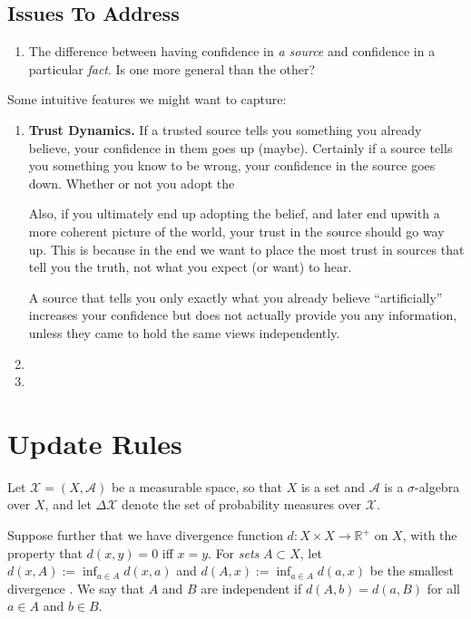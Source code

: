 \documentclass{article}
\begin{document}
\subsection*{Issues To Address}
\begin{enumerate}
    \item The difference between having confidence in \emph{a source} and confidence in a particular \emph{fact}.  Is one more general than the other? 
\end{enumerate}
    
Some intuitive features we might want to capture:
\begin{enumerate}
    
    \item \textbf{Trust Dynamics.} If a trusted source tells you something you already believe, your confidence in them goes up (maybe). Certainly if a source tells you something you know to be wrong, your confidence in the source goes down.  Whether or not you adopt the 
    
    Also, if you ultimately end up adopting the belief, and later end upwith a more coherent picture of the world, your trust in the source should go way up. 
    This is because in the end we want to place the most trust in sources that tell you the truth, not what you expect (or want) to hear.
    
    A source that tells you only exactly what you already believe ``artificially'' increases your confidence but does not actually provide you any information, unless they came to hold the same views independently. 
    
    \item 
    \item 
\end{enumerate}

\section{Update Rules}
\def\X{\mathcal X}
Let $\X = (X, \mathcal A)$ be a measurable space, so that $X$ is a set and $\mathcal A$ is a $\sigma$-algebra over $X$, and let $\Delta \X$ denote the set of probability measures over $\X$.

Suppose further that we have divergence function $d : X \times X \to \mathbb R^+$ on $X$, with the property that $d(x,y) = 0$ iff $x = y$. 
For \emph{sets} $A \subset X$, let $d(x, A) := \inf_{a \in A} d(x,a)$ and $d(A, x) := \inf_{a \in A} d(a,x)$ be the smallest divergence .
We say that $A$ and $B$ are independent if $d(A, b) = d(a, B)$ for all $a\in A$ and $b \in B$. 
\end{document}
